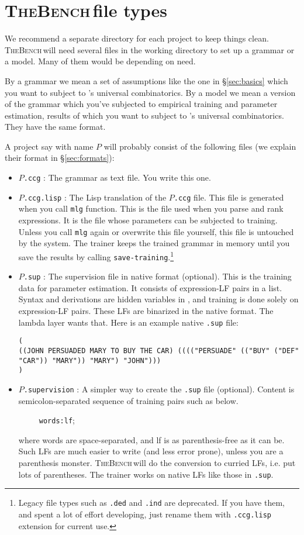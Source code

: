 \documentclass[11pt]{article}
\newcommand{\tool}{\textsc{TheBench}}
\begin{document}
\section{\tool\,file types}
We recommend  a separate directory for each project to keep things clean.
\tool\,will need several files in the working directory to set up a  grammar or a model.
Many of them would be depending on need.

By a grammar
we mean a set of  assumptions like the one in \S\ref{sec:basics} which you want to subject to 's universal combinatorics.
By a model we mean a version of the grammar which you've subjected to empirical training and parameter
estimation, results of which you want to subject to 's universal combinatorics. They have the same format.

A project say with name $P$ will probably consist of the following files (we explain their format in \S\ref{sec:formats}):
\begin{itemize}
\setlength{\itemsep}{0pt}
\setlength{\parskip}{0pt}
\setlength{\parsep}{0pt}
\item $P$\verb|.ccg| : The  grammar as text file. You write this one.
\item $P$\verb+.ccg.lisp+ : The Lisp translation of the $P$\verb+.ccg+ file. This file is generated when
you call \verb+mlg+ function. This is the file  used when you parse and rank expressions.
It is the file  whose parameters can be subjected to training. {Unless you call} \verb+mlg+ {again or overwrite this file yourself, this file is untouched by the system. The trainer keeps the trained grammar in memory until you save the results by calling} \verb+save-training+.\footnote{Legacy file types such as \verb+.ded+ and \verb+.ind+ are deprecated. If you have them, and spent a lot of effort
developing, just rename them with \verb+.ccg.lisp+ extension for current use.}

\item $P$\verb|.sup| : The supervision file in native format (optional). This is the training data for  parameter estimation. It consists of expression-LF pairs in a list. Syntax and derivations are hidden variables in , and training is done solely on expression-LF pairs. 
{These LFs are binarized in the native format. The lambda layer wants that.}
Here is an example native \verb+.sup+ file:
{\scriptsize\begin{verbatim}
(
((JOHN PERSUADED MARY TO BUY THE CAR) (((("PERSUADE" (("BUY" ("DEF" "CAR")) "MARY")) "MARY") "JOHN")))
)
\end{verbatim}}

\item $P$\verb|.supervision| : {A simpler way to create the} \verb|.sup| file (optional). Content is semicolon-separated
sequence of training pairs such as below.  

~~~~~{\texttt{words:lf};}

where words are space-separated, and lf is as parenthesis-free as it can be.
Such LFs are much easier to write (and less error prone),  unless you are a parenthesis monster. {\tool\,will do the conversion
to curried LFs, i.e. put lots of parentheses. The trainer works on native LFs like those in} \verb+.sup+.
\end{itemize}
\end{document}
